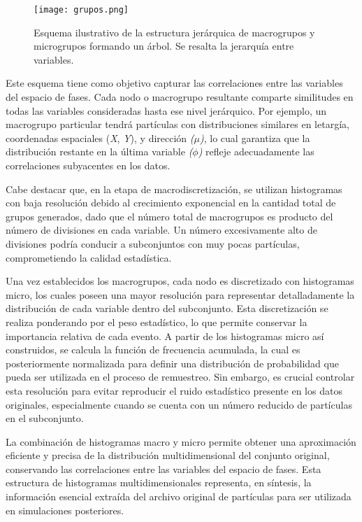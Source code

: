 \begin{figure}[h]
    \centering
    \texttt{[image: grupos.png]}
    \caption{Esquema ilustrativo de la estructura jerárquica de macrogrupos y microgrupos formando un árbol. Se resalta la jerarquía entre variables.}
    \label{fig:estructura_jerarquica}
\end{figure}

Este esquema tiene como objetivo capturar las correlaciones entre las variables del espacio de fases. Cada nodo o macrogrupo resultante comparte similitudes en todas las variables consideradas hasta ese nivel jerárquico. Por ejemplo, un macrogrupo particular tendrá partículas con distribuciones similares en letargía, coordenadas espaciales (\textit{X}, \textit{Y}), y dirección \textit{($\mu$)}, lo cual garantiza que la distribución restante en la última variable \textit{($\phi$)} refleje adecuadamente las correlaciones subyacentes en los datos.

Cabe destacar que, en la etapa de macrodiscretización, se utilizan histogramas con baja resolución debido al crecimiento exponencial en la cantidad total de grupos generados, dado que el número total de macrogrupos es producto del número de divisiones en cada variable. Un número excesivamente alto de divisiones podría conducir a subconjuntos con muy pocas partículas, comprometiendo la calidad estadística.

Una vez establecidos los macrogrupos, cada nodo es discretizado con histogramas micro, los cuales poseen una mayor resolución para representar detalladamente la distribución de cada variable dentro del subconjunto. Esta discretización se realiza ponderando por el peso estadístico, lo que permite conservar la importancia relativa de cada evento. A partir de los histogramas micro así construidos, se calcula la función de frecuencia acumulada, la cual es posteriormente normalizada para definir una distribución de probabilidad que pueda ser utilizada en el proceso de remuestreo. Sin embargo, es crucial controlar esta resolución para evitar reproducir el ruido estadístico presente en los datos originales, especialmente cuando se cuenta con un número reducido de partículas en el subconjunto.

La combinación de histogramas macro y micro permite obtener una aproximación eficiente y precisa de la distribución multidimensional del conjunto original, conservando las correlaciones entre las variables del espacio de fases. Esta estructura de histogramas multidimensionales representa, en síntesis, la información esencial extraída del archivo original de partículas para ser utilizada en simulaciones posteriores.

